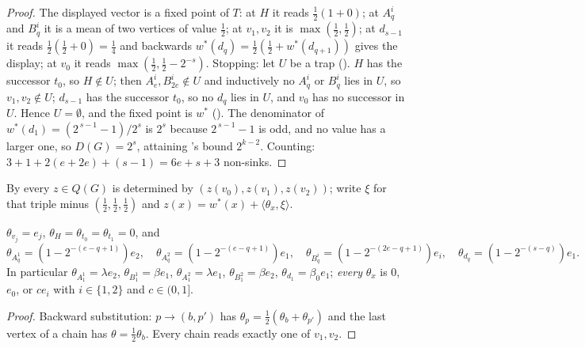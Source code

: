 \begin{proof}
The displayed vector is a fixed point of $T$: at $H$ it reads
$\tfrac12(1+0)$; at $A^{i}_q$ and $B^{i}_q$ it is a mean of two vertices of
value $\tfrac12$; at $v_1,v_2$ it is $\max(\tfrac12,\tfrac12)$; at $d_{s-1}$ it
reads $\tfrac12(\tfrac12+0)=\tfrac14$ and backwards
$w^\ast(d_q)=\tfrac12(\tfrac12+w^\ast(d_{q+1}))$ gives the display; at $v_0$ it
reads $\max(\tfrac12,\tfrac12-2^{-s})$. Stopping: let $U$ be a trap
(). $H$ has the successor $t_0$, so $H\notin U$; then
$A^{i}_e,B^{i}_{2e}\notin U$ and inductively no $A^{i}_q$ or $B^{i}_q$ lies in
$U$, so $v_1,v_2\notin U$; $d_{s-1}$ has the successor $t_0$, so no $d_q$ lies
in $U$, and $v_0$ has no successor in $U$. Hence $U=\emptyset$, and the fixed
point is $w^\ast$ (). The denominator of
$w^\ast(d_1)=(2^{\,s-1}-1)/2^{s}$ is $2^{s}$ because $2^{\,s-1}-1$ is odd, and
no value has a larger one, so $D(G)=2^{s}$, attaining
's bound $2^{k-2}$. Counting:
$3+1+2(e+2e)+(s-1)=6e+s+3$ non-sinks.
\end{proof}

By  every $z\in Q(G)$ is determined by
$(z(v_0),z(v_1),z(v_2))$; write $\xi$ for that triple minus
$(\tfrac12,\tfrac12,\tfrac12)$ and $z(x)=w^\ast(x)+\langle\theta_x,\xi\rangle$.

\begin{lemma}\label{lem:fd-cv-lift}
$\theta_{v_j}=e_j$, $\theta_H=\theta_{t_0}=\theta_{t_1}=0$, and
\[
  \theta_{A^{1}_q}=(1-2^{-(e-q+1)})e_2,\quad
  \theta_{A^{2}_q}=(1-2^{-(e-q+1)})e_1,\quad
  \theta_{B^{i}_q}=(1-2^{-(2e-q+1)})e_{i},\quad
  \theta_{d_q}=(1-2^{-(s-q)})e_1 .
\]
In particular $\theta_{A^{1}_1}=\lambda e_2$, $\theta_{B^{1}_1}=\beta e_1$,
$\theta_{A^{2}_1}=\lambda e_1$, $\theta_{B^{2}_1}=\beta e_2$,
$\theta_{d_1}=\beta_0e_1$; \emph{every} $\theta_x$ is $0$, $e_0$, or $ce_i$
with $i\in\{1,2\}$ and $c\in(0,1]$.
\end{lemma}

\begin{proof}
Backward substitution: $p\to(b,p')$ has
$\theta_p=\tfrac12(\theta_b+\theta_{p'})$ and the last vertex of a chain has
$\theta=\tfrac12\theta_b$. Every chain reads exactly one of $v_1,v_2$.
\end{proof}

